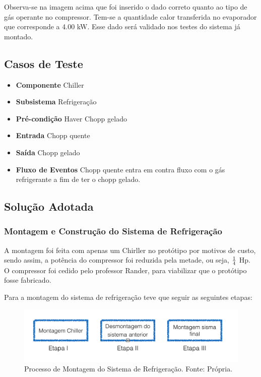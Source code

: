                 Observa-se na imagem acima que foi inserido o dado correto quanto ao
                tipo de gás operante no compressor. Tem-se a quantidade calor transferida no
                evaporador que corresponde a 4.00 kW. Esse dado será validado nos testes do
                sistema já montado.
        
        \subsection[Casos de Teste]{Casos de Teste}
                \begin{itemize}
                    \item \textbf{Componente} Chiller
                    \item \textbf{Subsistema} Refrigeração
                    \item \textbf{Pré-condição} Haver Chopp gelado
                    \item \textbf{Entrada} Chopp quente
                    \item \textbf{Saída} Chopp gelado
                    \item \textbf{Fluxo de Eventos} Chopp quente entra em contra fluxo com o gás refrigerante a fim de
                        ter o chopp gelado.
                \end{itemize}

        \subsection[Solução Adotada]{Solução Adotada}
            \subsubsection[Montagem e Construção do Sistema de Refrigeração]{Montagem e Construção do Sistema de Refrigeração}
                A montagem foi feita com apenas um Chirller no protótipo por motivos de custo,
                sendo assim, a potência do compressor foi reduzida pela metade, ou seja, $1 \over 4$ Hp. O
                compressor foi cedido pelo professor Rander, para viabilizar que o protótipo fosse
                fabricado.
                
                Para a montagem do sistema de refrigeração teve que seguir as seguintes
                etapas:
                \begin{figure}[!htb]
            		\centering
            		\includegraphics[scale= 0.3]{figuras/montagem-chiler.png}
            		\caption{Processo de Montagem do Sistema de Refrigeração. Fonte: Própria.}
            		\label{simulacao-refrigeracao}
                \end{figure}
                
